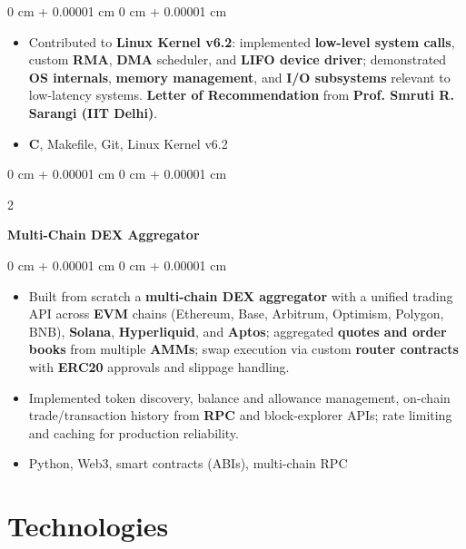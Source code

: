 \documentclass[10pt, letterpaper]{article}
\newenvironment{highlightsjustified}{
    \begin{itemize}[
        topsep=0.10 cm,
        parsep=0.10 cm,
        partopsep=0pt,
        itemsep=0pt,
        leftmargin=0 cm + 10pt
    ]
    \justifying
}{
    \end{itemize}
} %
\newenvironment{onecolentry}{
    \begin{adjustwidth}{
        0 cm + 0.00001 cm
    }{
        0 cm + 0.00001 cm
    }
}{
    \end{adjustwidth}
} %
\newenvironment{twocolentry}[2][]{
    \onecolentry
    \def\secondColumn{#2}
    \setcolumnwidth{\fill, 4.5 cm}
    \begin{paracol}{2}
}{
    \switchcolumn \raggedleft \secondColumn
    \end{paracol}
    \endonecolentry
} %
\begin{document}
        \vspace{0.10 cm}
        \begin{onecolentry}
            \begin{highlightsjustified}
                \item Contributed to \textbf{Linux Kernel v6.2}: implemented \textbf{low-level system calls}, custom \textbf{RMA}, \textbf{DMA} scheduler, and \textbf{LIFO device driver}; demonstrated \textbf{OS internals}, \textbf{memory management}, and \textbf{I/O subsystems} relevant to low-latency systems. \textbf{Letter of Recommendation} from \textbf{Prof. Smruti R. Sarangi (IIT Delhi)}.
                \item \textbf{C}, Makefile, Git, Linux Kernel v6.2
            \end{highlightsjustified}
        \end{onecolentry}


        \vspace{0.2 cm}

        \begin{twocolentry}{}
            \textbf{Multi-Chain DEX Aggregator}
        \end{twocolentry}

        \vspace{0.10 cm}
        \begin{onecolentry}
            \begin{highlightsjustified}
                \item Built from scratch a \textbf{multi-chain DEX aggregator} with a unified trading API across \textbf{EVM} chains (Ethereum, Base, Arbitrum, Optimism, Polygon, BNB), \textbf{Solana}, \textbf{Hyperliquid}, and \textbf{Aptos}; aggregated \textbf{quotes and order books} from multiple \textbf{AMMs}; swap execution via custom \textbf{router contracts} with \textbf{ERC20} approvals and slippage handling.
                \item Implemented token discovery, balance and allowance management, on-chain trade/transaction history from \textbf{RPC} and block-explorer APIs; rate limiting and caching for production reliability.
                \item Python, Web3, smart contracts (ABIs), multi-chain RPC
            \end{highlightsjustified}
        \end{onecolentry}


    
    \section{Technologies}
\end{document}
